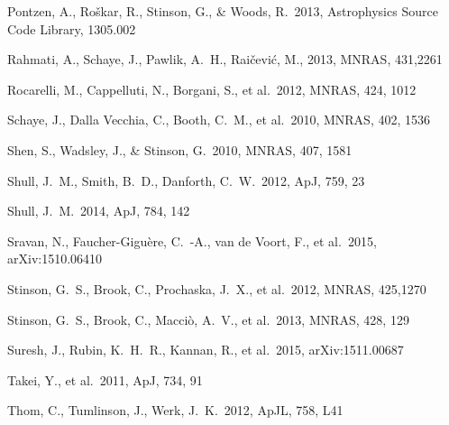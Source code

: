 \documentclass[useAMS,usenatbib]{mn2e}
\def \apj {ApJ}
\def \apjl {ApJL}
\def \mnras {MNRAS}
\begin{document}
\begin{thebibliography}{}
 Pontzen, A., Ro{\v s}kar, R., Stinson, G., \& Woods, R.\ 2013, Astrophysics Source Code Library, 1305.002 



 Rahmati, A., Schaye, J., Pawlik, A.~H., Rai{\v c}evi{\'c}, M., 2013, MNRAS, 431,2261

%
 Rocarelli, M., Cappelluti, N., Borgani, S., et al.\ 2012, \mnras, 424, 1012


%
 Schaye, J., Dalla Vecchia, C., Booth, C.~M., et al.\ 2010, \mnras, 402, 1536

 Shen, S., Wadsley, J., 
\& Stinson, G.\ 2010, \mnras, 407, 1581 

Shull, J.~M., Smith, B.~D., Danforth, C.~W.\ 2012, \apj, 759, 23

%
Shull, J.~M.\ 2014, \apj, 784, 142

 Sravan, N., Faucher-Gigu{\`e}re, C.~-A., van de Voort, F., et al.\ 2015, arXiv:1510.06410

%
 Stinson, G.~S., Brook, C., Prochaska, J.~X., et al.\ 2012, \mnras, 425,1270

 Stinson, G.~S., Brook, 
C., Macci{\`o}, A.~V., et al.\ 2013, \mnras, 428, 129 

%
 Suresh, J., Rubin, K.~H.~R., Kannan, R., et al.\ 2015, arXiv:1511.00687



%
 Takei, Y., et al.\ 2011, \apj, 734, 91

Thom, C., Tumlinson, J., Werk, J.~K.\ 2012, \apjl, 758, L41


\end{thebibliography}
\end{document}
